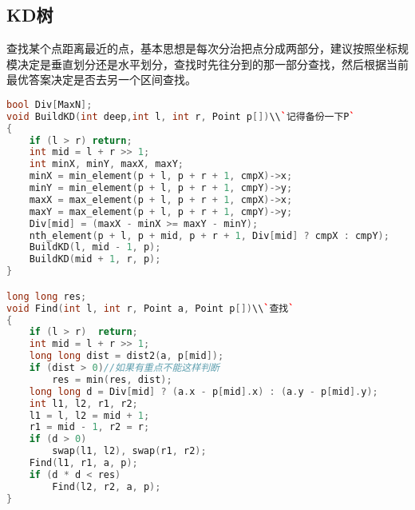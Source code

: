 \subsection{KD树}
    查找某个点距离最近的点，基本思想是每次分治把点分成两部分，建议按照坐标规模决定是垂直划分还是水平划分，查找时先往分到的那一部分查找，然后根据当前最优答案决定是否去另一个区间查找。
    \begin{lstlisting}[language=c++]
bool Div[MaxN];
void BuildKD(int deep,int l, int r, Point p[])\\`记得备份一下P`
{
    if (l > r) return;
    int mid = l + r >> 1;
    int minX, minY, maxX, maxY;
    minX = min_element(p + l, p + r + 1, cmpX)->x;
    minY = min_element(p + l, p + r + 1, cmpY)->y;
    maxX = max_element(p + l, p + r + 1, cmpX)->x;
    maxY = max_element(p + l, p + r + 1, cmpY)->y;
    Div[mid] = (maxX - minX >= maxY - minY);
    nth_element(p + l, p + mid, p + r + 1, Div[mid] ? cmpX : cmpY);
    BuildKD(l, mid - 1, p);
    BuildKD(mid + 1, r, p);
}

long long res;
void Find(int l, int r, Point a, Point p[])\\`查找`
{
    if (l > r)  return;
    int mid = l + r >> 1;
    long long dist = dist2(a, p[mid]);
    if (dist > 0)//如果有重点不能这样判断
        res = min(res, dist);
    long long d = Div[mid] ? (a.x - p[mid].x) : (a.y - p[mid].y);
    int l1, l2, r1, r2;
    l1 = l, l2 = mid + 1;
    r1 = mid - 1, r2 = r;
    if (d > 0)
        swap(l1, l2), swap(r1, r2);
    Find(l1, r1, a, p);
    if (d * d < res)
        Find(l2, r2, a, p);
}
    \end{lstlisting}
